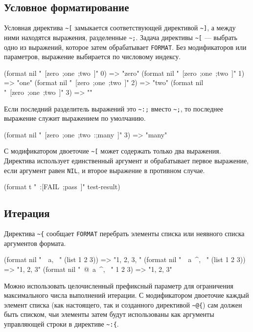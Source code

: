 \subsection{Условное форматирование}
Условная директива \lstinline{~[} замыкается соответствующей директивой \lstinline{~]}, а между ними находятся выражения, разделенные \lstinline{~;}. Задача директивы \lstinline{~[} — выбрать одно из выражений, которое затем обрабатывает \lstinline{FORMAT}. Без модификаторов или параметров, выражение выбирается по числовому индексу.
\begin{cllst}{}{}
(format nil "~[zero~;one~;two~]" 0) => "zero"
(format nil "~[zero~;one~;two~]" 1) => "one"
(format nil "~[zero~;one~;two~]" 2) => "two"
(format nil "~[zero~;one~;two~]" 3) => ""
\end{cllst}

Если последний разделитель выражений это \lstinline{~:;} вместо \lstinline{~;}, то последнее выражение служит выражением по умолчанию.
\begin{cllst}{}{}
(format nil "~[zero~;one~;two~:;many~]" 3)   => "many"
\end{cllst}

С модификатором двоеточие \lstinline{~[} может содержать только два выражения. Директива использует единственный аргумент и обрабатывает первое выражение, если аргумент равен \lstinline{NIL}, и второе выражение в противном случае.
\begin{cllst}{}{}
(format t "~:[FAIL~;pass~]" test-result)
\end{cllst}

\subsection{Итерация}
Директива \lstinline{~{} сообщает \lstinline{FORMAT} перебрать элементы списка или неявного списка аргументов формата.
\begin{cllst}{}{}
(format nil "~{~a, ~}" (list 1 2 3))   => "1, 2, 3, "
(format nil "~{~a~^, ~}" (list 1 2 3)) => "1, 2, 3"
(format nil "~@{~a~^, ~}" 1 2 3)       => "1, 2, 3"
\end{cllst}

Можно использовать целочисленный префиксный параметр для ограничения максимального числа выполнений итерации. С модификатором двоеточие каждый элемент списка (как настоящего, так и созданного директивой \lstinline{~@{}) сам должен быть списком, чьи элементы затем будут использованы как аргументы управляющей строки в директиве \lstinline{~:{}.

